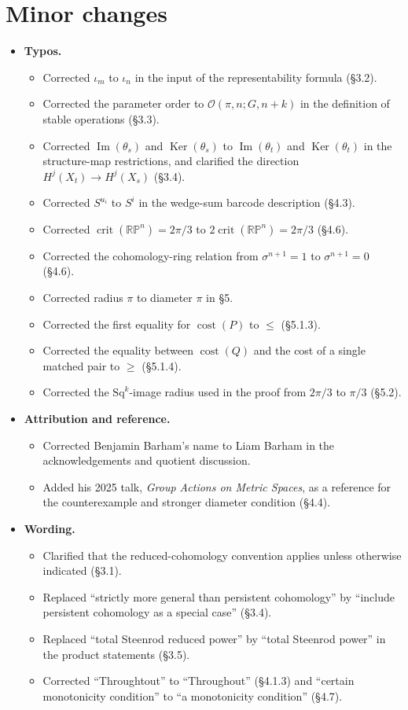 \section*{Minor changes}
\begin{itemize}
\item \textbf{Typos.}
\begin{itemize}
\item Corrected $\iota_m$ to $\iota_n$ in the input of the representability formula (\S3.2).
\item Corrected the parameter order to $\mathcal O(\pi,n;G,n+k)$ in the definition of stable operations (\S3.3).
\item Corrected $\operatorname{Im}(\theta_s)$ and $\operatorname{Ker}(\theta_s)$ to $\operatorname{Im}(\theta_t)$ and $\operatorname{Ker}(\theta_t)$ in the structure-map restrictions, and clarified the direction $H^j(X_t)\to H^j(X_s)$ (\S3.4).
\item Corrected $S^{u_i}$ to $S^i$ in the wedge-sum barcode description (\S4.3).
\item Corrected $\operatorname{crit}(\mathbb{RP}^n)=2\pi/3$ to $2\operatorname{crit}(\mathbb{RP}^n)=2\pi/3$ (\S4.6).
\item Corrected the cohomology-ring relation from $\sigma^{n+1}=1$ to $\sigma^{n+1}=0$ (\S4.6).
\item Corrected radius $\pi$ to diameter $\pi$ in \S5.
\item Corrected the first equality for $\operatorname{cost}(P)$ to $\leq$ (\S5.1.3).
\item Corrected the equality between $\operatorname{cost}(Q)$ and the cost of a single matched pair to $\geq$ (\S5.1.4).
\item Corrected the $\mathrm{Sq}^k$-image radius used in the proof from $2\pi/3$ to $\pi/3$ (\S5.2).
\end{itemize}

\item \textbf{Attribution and reference.}
\begin{itemize}
\item Corrected Benjamin Barham's name to Liam Barham in the acknowledgements and quotient discussion.
\item Added his 2025 talk, \emph{Group Actions on Metric Spaces}, as a reference for the counterexample and stronger diameter condition (\S4.4).
\end{itemize}

\item \textbf{Wording.}
\begin{itemize}
\item Clarified that the reduced-cohomology convention applies unless otherwise indicated (\S3.1).
\item Replaced ``strictly more general than persistent cohomology'' by ``include persistent cohomology as a special case'' (\S3.4).
\item Replaced ``total Steenrod reduced power'' by ``total Steenrod power'' in the product statements (\S3.5).
\item Corrected ``Throughtout'' to ``Throughout'' (\S4.1.3) and ``certain monotonicity condition'' to ``a monotonicity condition'' (\S4.7).
\end{itemize}


\end{itemize}
